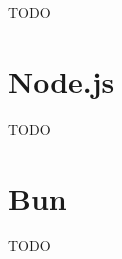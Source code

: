 \label{Theoretische und technische Grundlagen}
TODO

\section{Node.js} \label{sec:Node.js}
TODO\\

\section{Bun} \label{sec:Node}
TODO\\
